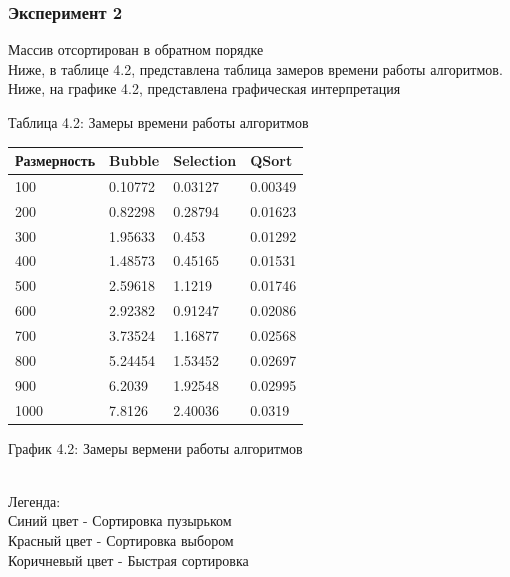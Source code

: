 \documentclass[12pt,a4paper]{article}
\numberwithin{equation}{section}
\begin{document}
\subsubsection{Эксперимент 2}
Массив отсортирован в обратном порядке\\
Ниже, в таблице 4.2, представлена таблица замеров времени работы алгоритмов.\\
Ниже, на графике 4.2, представлена графическая интерпретация\\
\begin{center}
	Таблица 4.2: Замеры времени работы алгоритмов
	\begin{tabular}{| l | | l | l | l |}
		\hline
		Размерность & Bubble & Selection & QSort\\\hline
		100 & 0.10772 & 0.03127 & 0.00349\\\hline 
		200 & 0.82298 & 0.28794 & 0.01623\\\hline
		300 & 1.95633 & 0.453 & 0.01292\\\hline
		400 & 1.48573 & 0.45165 & 0.01531\\\hline
		500 & 2.59618 & 1.1219 & 0.01746\\\hline
		600 & 2.92382 & 0.91247 & 0.02086\\\hline
		700 & 3.73524 & 1.16877 & 0.02568\\\hline
		800 & 5.24454 & 1.53452 & 0.02697\\\hline
		900 & 6.2039 & 1.92548 & 0.02995\\\hline
		1000 & 7.8126 & 2.40036 & 0.0319\\\hline
	\end{tabular}
\end{center}
\begin{center}
	График 4.2: Замеры вермени работы алгоритмов\\
	\\
	Легенда:\\
	Синий цвет - Сортировка пузырьком\\
	Красный цвет - Сортировка выбором\\
	Коричневый цвет - Быстрая сортировка\\
\end{center}
\end{document}
